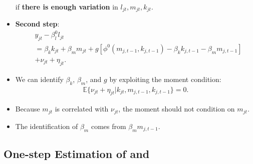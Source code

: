 \documentclass[
]{book}
\begin{document}
\begin{itemize}
\begin{equation}
\begin{split}
  \end{split}
  \end{equation}
  if \textbf{there is enough variation} in \(l_{jt}, m_{jt}, k_{jt}\).
\item
  \textbf{Second step}:
  \begin{equation}
  \begin{split}
  &y_{jt} - \beta_l^0 l_{jt}\\
  & = \beta_k k_{jt} + \beta_m m_{jt} + g[\phi^0(m_{j, t - 1}, k_{j, t - 1}) - \beta_k k_{j, t - 1} - \beta_m m_{j, t - 1}]\\
  & + \nu_{jt} + \eta_{jt}.
  \end{split}
  \end{equation}
\item
  We can identify \(\beta_k\), \(\beta_m\), and \(g\) by exploiting the moment condition:
  \begin{equation}
  \begin{split}
  \mathbb{E}\{\nu_{jt} + \eta_{jt} | k_{jt}, m_{j, t - 1}, k_{j,t - 1}\} = 0.
  \end{split}
  \end{equation}
\item
  Because \(m_{jt}\) is correlated with \(\nu_{jt}\), the moment should not condition on \(m_{jt}\).
\item
  The identification of \(\beta_{m}\) comes from \(\beta_m m_{j, t - 1}\).
\end{itemize}

\hypertarget{one-step-estimation-of-olley1996-and-levinsohn2003}{%
\subsection{\texorpdfstring{One-step Estimation of \citet{Olley1996} and \citet{Levinsohn2003}}{One-step Estimation of @Olley1996 and @Levinsohn2003}}\label{one-step-estimation-of-olley1996-and-levinsohn2003}}
\end{document}
